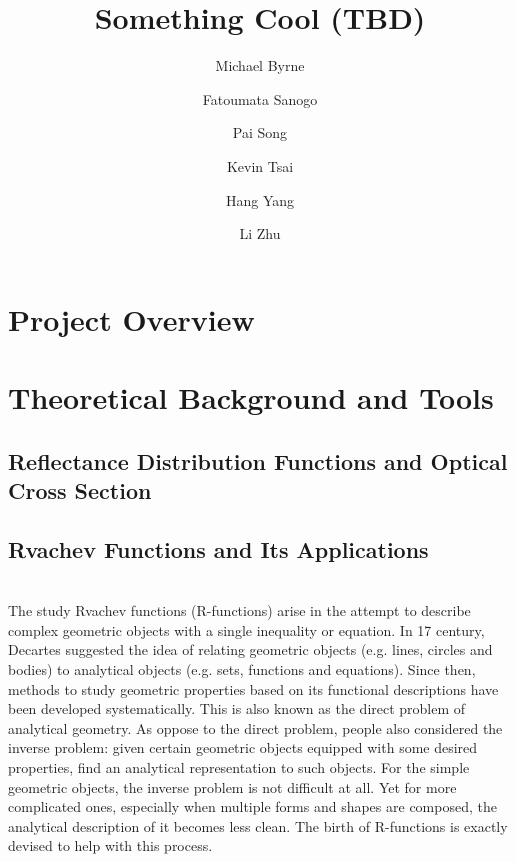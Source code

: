 \documentclass[12pt]{amsart}
\author{ Michael Byrne}
\author{Fatoumata Sanogo}
\author{Pai Song}
\author{Kevin Tsai}
\author{Hang Yang}
\author{Li Zhu}
\title{Something Cool (TBD)}
\theoremstyle{definition}
\begin{document}
\maketitle

\section{Project Overview}

\section{Theoretical Background and Tools}
\subsection{Reflectance Distribution Functions and Optical Cross Section}
\subsection{Rvachev Functions and Its Applications}~\\
The study Rvachev functions (R-functions) arise in the attempt to describe complex geometric objects with a single inequality or equation. In 17 century, Decartes suggested the idea of relating geometric objects (e.g. lines, circles and bodies) to analytical objects (e.g. sets, functions and equations). Since then, methods to study geometric properties based on its functional descriptions have been developed systematically. This is also known as the direct problem of analytical geometry. As oppose to the direct problem, people also considered the inverse problem: given certain geometric objects equipped with some desired properties, find an analytical representation to such objects. For the simple geometric objects, the inverse problem is not difficult at all. Yet for more complicated ones, especially when multiple forms and shapes are composed, the analytical description of it becomes less clean. The birth of R-functions is exactly devised to help with this process.    
\end{document}
